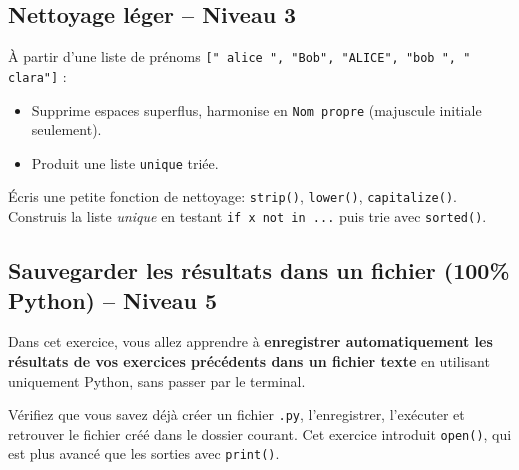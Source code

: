 \documentclass[11pt,a4paper]{article}
\begin{document}
\subsection*{Nettoyage léger -- Niveau 3}
À partir d'une liste de prénoms \texttt{[" alice ", "Bob", "ALICE", "bob ", "  clara"]} :
\begin{itemize}
    \item Supprime espaces superflus, harmonise en \texttt{Nom propre} (majuscule initiale seulement).
    \item Produit une liste \texttt{unique} triée.
\end{itemize}
\begin{tcolorbox}[title=Aide]
Écris une petite fonction de nettoyage: \texttt{strip()}, \texttt{lower()}, \texttt{capitalize()}.\\
Construis la liste \emph{unique} en testant \texttt{if x not in ...} puis trie avec \texttt{sorted()}.
\end{tcolorbox}

\newpage

\subsection*{Sauvegarder les résultats dans un fichier (100\% Python) -- Niveau 5}

Dans cet exercice, vous allez apprendre à \textbf{enregistrer automatiquement les résultats de vos exercices précédents dans un fichier texte} en utilisant uniquement Python, sans passer par le terminal.

\begin{tcolorbox}[title=Avant de commencer]
Vérifiez que vous savez déjà créer un fichier \texttt{.py}, l'enregistrer, l'exécuter et retrouver le fichier créé dans le dossier courant. Cet exercice introduit \texttt{open()}, qui est plus avancé que les sorties avec \texttt{print()}.
\end{tcolorbox}
\end{document}
